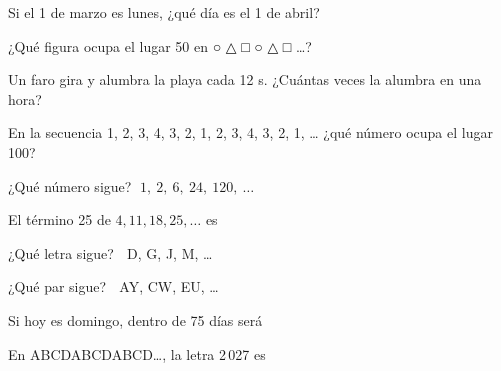 \taller
{}
\begin{ejercicios}
\item Si el 1 de marzo es lunes, ¿qué día es el 1 de abril? 
\item ¿Qué figura ocupa el lugar 50 en ○ △ □ ○ △ □ …? 
\item Un faro gira y alumbra la playa cada 12 s. ¿Cuántas veces la alumbra en una hora? 
\end{ejercicios}
\begin{ejercicios}
\item En la secuencia 1, 2, 3, 4, 3, 2, 1, 2, 3, 4, 3, 2, 1, … ¿qué número ocupa el lugar 100?
\end{ejercicios}

\bitacora

\evaluacion
\begin{ejercicios}
\item ¿Qué número sigue? $\;1,\ 2,\ 6,\ 24,\ 120,\ \ldots$
\item El término 25 de $4, 11, 18, 25, \ldots$ es
\item ¿Qué letra sigue? $\;$ D, G, J, M, …
\item ¿Qué par sigue? $\;$ AY, CW, EU, …
\item Si hoy es domingo, dentro de 75 días será
\item En ABCDABCDABCD…, la letra 2\,027 es
\end{ejercicios}
